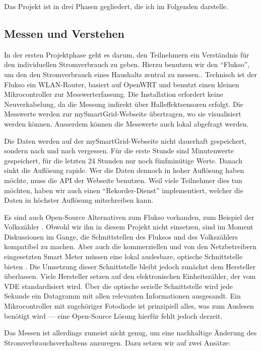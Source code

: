 \documentclass[12pt,BCOR=8.5mm]{scrartcl}
\begin{document}
Das Projekt ist in drei Phasen gegliedert, die ich im Folgenden
darstelle.

\subsection{Messen und Verstehen}\label{sub:messenverstehen}

In der ersten Projektphase geht es darum, den Teilnehmern ein
Verständnis für den individuellen Stromverbrauch zu geben. Hierzu
benutzen wir den "`Flukso"', um den den Stromverbrauch eines Haushalts
zentral zu messen.. Technisch ist der
Flukso ein WLAN-Router, basiert auf OpenWRT und benutzt einen kleinen
Mikrocontroller zur Messwerterfassung. Die Installation erfordert keine
Neuverkabelung, da die Messung indirekt über Halleffektsensoren erfolgt.
Die Messwerte werden zur mySmartGrid-Webseite übertragen, wo sie
visualisiert werden können. Ausserdem können die Messwerte auch lokal
abgefragt werden.

Die Daten werden auf der mySmartGrid-Webseite nicht dauerhaft
gespeichert, sondern nach und nach vergessen. Für die erste Stunde sind
Minutenwerte gespeichert, für die letzten 24 Stunden nur noch
fünfminütige Werte. Danach sinkt die Auflösung rapide. Wer die Daten
dennoch in hoher Auflösung haben möchte, muss die API der Webseite
benutzen. Weil viele Teilnehmer dies tun möchten, haben wir auch einen
"`Rekorder-Dienst"' implementiert, welcher die Daten in höchster
Auflösung mitschreiben kann. 

Es sind auch Open-Source Alternativen zum Flukso vorhanden, zum Beispiel
der Volkszähler . Obwohl wir ihn in diesem Projekt nicht einsetzen, sind
im Moment Diskussionen im Gange, die Schnittstellen des Fluksos und des
Volkszählers kompatibel zu machen. Aber auch die kommerziellen und von
den Netzbetreibern eingesetzten Smart Meter müssen eine lokal
auslesbare, optische Schnittstelle bieten .  Die Umsetzung dieser Schnittstelle bleibt jedoch
zunächst dem Hersteller überlassen. Viele Hersteller setzen auf den
elektronischen Einheitszähler, der vom VDE  standardisiert wird. Über die optische serielle
Schnittstelle wird jede Sekunde ein Datagramm mit allen relevanten
Informationen ausgesandt. Ein Mikrocontroller mit zugehöriger Fotodiode
ist prinzipiell alles, was zum Auslesen benötigt wird --- eine
Open-Source Lösung hierfür fehlt jedoch derzeit.

Das Messen ist allerdings zumeist nicht genug, um eine nachhaltige
Änderung des Stromverbrauchsverhaltens anzuregen. Dazu setzen wir auf
zwei Ansätze:
\end{document}
